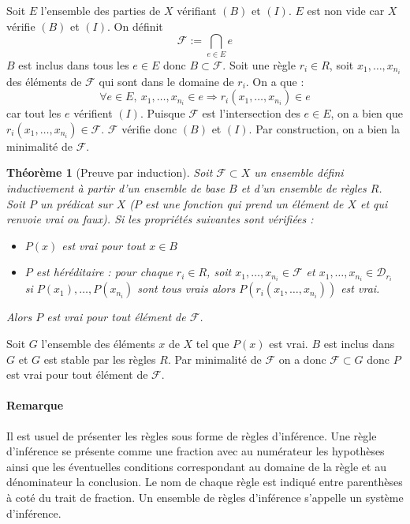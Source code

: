 \documentclass[a4paper,12pt]{article}
\theoremstyle{plain}
\newtheorem{theo}{Théorème}[subsection]
\newenvironment{demo}[1][]
 {\if\relax\detokenize{#1}\relax
    \renewcommand\theproofinner{\thetheo}%
  \else
    \renewcommand{\theproofinner}{#1}%
  \fi
  \proofinner}
 {\endproofinner}
\begin{document}
\begin{demo}
Soit $E$ l'ensemble des parties de $X$ vérifiant $(B)$ et $(I)$. $E$ est non vide car $X$ vérifie $(B)$ et $(I)$. On définit 
$$ \mathcal{F} := \bigcap_{e \in E} e$$
$B$ est inclus dans tous les $e \in E$ donc $B \subset \mathcal{F}$. Soit une règle $r_i \in R$, soit $x_1, \dots, x_{n_i}$ des éléments de $\mathcal{F}$ qui sont dans le domaine de $r_i$. On a que :
$$\forall e \in E, \ x_1, \dots, x_{n_i} \in e \Rightarrow r_i(x_1, \dots, x_{n_i}) \in e$$
car tout les $e$ vérifient $(I)$. Puisque $\mathcal{F}$ est l'intersection des $e \in E$, on a bien que $r_i(x_1, \dots, x_{n_i}) \in \mathcal{F}$. $\mathcal{F}$ vérifie donc $(B)$ et $(I)$. Par construction, on a bien la minimalité de $\mathcal{F}$.
\end{demo}

\clearpage

\begin{theo}[Preuve par induction]
Soit $\mathcal{F} \subset X$ un ensemble défini inductivement à partir d'un ensemble de base $B$ et d'un ensemble de règles $R$. Soit $P$ un prédicat sur $X$ ($P$ est une fonction qui prend un élément de $X$ et qui renvoie vrai ou faux). Si les propriétés suivantes sont vérifiées :
\begin{itemize}
\setlength\itemsep{ -1.5 em}
\item  $P(x)$ est vrai pour tout  $x \in B$\\
\item $P$ est héréditaire : pour chaque $r_i \in R$, soit $x_1, \dots, x_{n_i} \in \mathcal{F}$ et $x_1, \dots, x_{n_i} \in \mathcal{D}_{r_i}$ si $P(x_1), \dots, P(x_{n_i})$ sont tous vrais alors $P(r_i(x_1, \dots, x_{n_i}))$ est vrai.
\end{itemize}
Alors $P$ est vrai pour tout élément de $\mathcal{F}$.
\end{theo}

\begin{demo} 
Soit $G$ l'ensemble des éléments $x$ de $X$ tel que $P(x)$ est vrai. $B$ est inclus dans $G$ et $G$ est stable par les règles $R$. Par minimalité de $\mathcal{F}$ on a donc $\mathcal{F} \subset G$ donc $P$ est vrai pour tout élément de $\mathcal{F}$. 
\end{demo}

\paragraph{Remarque}

Il est usuel de présenter les règles sous forme de règles d'inférence. Une règle d'inférence se présente comme une fraction avec au numérateur les hypothèses ainsi que les éventuelles conditions correspondant au domaine de la règle et au dénominateur la conclusion. Le nom de chaque règle est indiqué entre parenthèses à coté du trait de fraction. Un ensemble de règles d'inférence s'appelle un système d'inférence.
\end{document}

